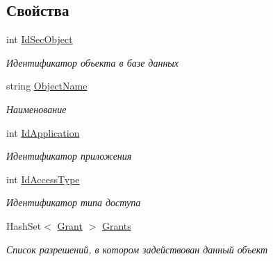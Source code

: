 \subsection*{Свойства}
\begin{DoxyCompactItemize}
\item 
int \hyperlink{class_security_1_1_model_1_1_sec_object_a498ec4f28b3e2d8c1d5060e3947e8d36}{Id\+Sec\+Object}
\begin{DoxyCompactList}\small\item\em Идентификатор объекта в базе данных \end{DoxyCompactList}\item 
string \hyperlink{class_security_1_1_model_1_1_sec_object_a108abf3c2957c7806401ff2702d47365}{Object\+Name}
\begin{DoxyCompactList}\small\item\em Наименование \end{DoxyCompactList}\item 
int \hyperlink{class_security_1_1_model_1_1_sec_object_ae73cf1d7b4d627f04cca57370f8a6887}{Id\+Application}
\begin{DoxyCompactList}\small\item\em Идентификатор приложения \end{DoxyCompactList}\item 
int \hyperlink{class_security_1_1_model_1_1_sec_object_aa8471553350f28eb2a5b56c6a49b19e6}{Id\+Access\+Type}
\begin{DoxyCompactList}\small\item\em Идентификатор типа доступа \end{DoxyCompactList}\item 
Hash\+Set$<$ \hyperlink{class_security_1_1_model_1_1_grant}{Grant} $>$ \hyperlink{class_security_1_1_model_1_1_sec_object_a5d0c6bc1ed3b41f9122eca5b8d229467}{Grants}
\begin{DoxyCompactList}\small\item\em Список разрешений, в котором задействован данный объект \end{DoxyCompactList}\item 

\end{DoxyCompactItemize}
